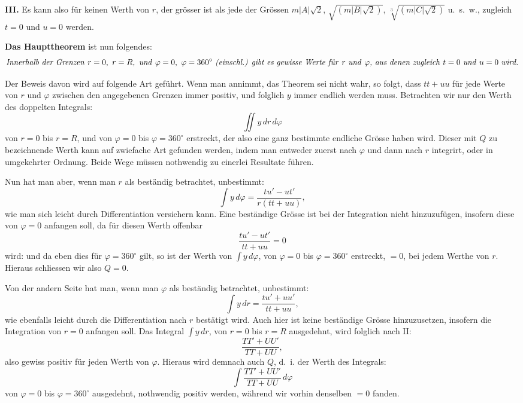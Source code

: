 \documentclass[12pt,a4paper]{article}
\newcommand{\1}{\ensuremath{\mathrlap{\,|\,}}} %
\begin{document}
\textbf{III.} Es kann also für keinen Werth von $r$, der grösser ist als jede der Grössen $m|A|\sqrt{2}$, $\sqrt{(m|B|\sqrt{2})}$, $\sqrt[3]{(m|C|\sqrt{2})}$ u.~s.~w., zugleich $t = 0$ und $u = 0$ werden.

\textbf{Das Haupttheorem} ist nun folgendes:
\[\text{\textit{Innerhalb der Grenzen }} r = 0,\ r = R,\ \text{\textit{und }} \varphi = 0,\ \varphi = 360^{\circ}\ \text{\textit{(einschl.) gibt es gewisse Werte f\"ur }} r \text{ \textit{und }} \varphi\text{\textit{, aus denen zugleich }} t = 0 \text{ \textit{und }} u = 0 \text{ \textit{wird.}}\]

Der Beweis davon wird auf folgende Art geführt. Wenn man annimmt, das Theorem sei nicht wahr, so folgt, dass $tt+uu$ für jede Werte von $r$ und $\varphi$ zwischen den angegebenen Grenzen immer positiv, und folglich $y$ immer endlich werden muss. Betrachten wir nur den Werth des doppelten Integrals:
\[\iint y\,dr\,d\varphi\]
von $r = 0$ bis $r = R$, und von $\varphi = 0$ bis $\varphi = 360^{\circ}$ erstreckt, der also eine ganz bestimmte endliche Grösse haben wird. Dieser mit $Q$ zu bezeichnende Werth kann auf zwiefache Art gefunden werden, indem man entweder zuerst nach $\varphi$ und dann nach $r$ integrirt, oder in umgekehrter Ordnung. Beide Wege müssen nothwendig zu einerlei Resultate führen.

Nun hat man aber, wenn man $r$ als beständig betrachtet, unbestimmt:
\[\int y\,d\varphi = \frac{tu'-ut'}{r(tt+uu)},\]
wie man sich leicht durch Differentiation versichern kann. Eine beständige Grösse ist bei der Integration nicht hinzuzufügen, insofern diese von $\varphi = 0$ anfangen soll, da für diesen Werth offenbar
\[\frac{tu'-ut'}{tt+uu} = 0\]
wird: und da eben dies für $\varphi = 360^{\circ}$ gilt, so ist der Werth von $\int y\,d\varphi$, von $\varphi = 0$ bis $\varphi = 360^{\circ}$ erstreckt, $= 0$, bei jedem Werthe von $r$. Hieraus schliessen wir also $Q = 0$.

Von der andern Seite hat man, wenn man $\varphi$ als beständig betrachtet, unbestimmt:
\[\int y\,dr = \frac{tu'+uu'}{tt+uu},\]
wie ebenfalls leicht durch die Differentiation nach $r$ bestätigt wird. Auch hier ist keine beständige Grösse hinzuzusetzen, insofern die Integration von $r = 0$ anfangen soll. Das Integral $\int y\,dr$, von $r = 0$ bis $r = R$ ausgedehnt, wird folglich nach II:
\[\frac{TT'+UU'}{TT+UU},\]
also gewiss positiv für jeden Werth von $\varphi$. Hieraus wird demnach auch $Q$, d.~i. der Werth des Integrals:
\[\int \frac{TT'+UU'}{TT+UU}\,d\varphi\]
von $\varphi = 0$ bis $\varphi = 360^{\circ}$ ausgedehnt, nothwendig positiv werden, während wir vorhin denselben $= 0$ fanden.
\end{document}

